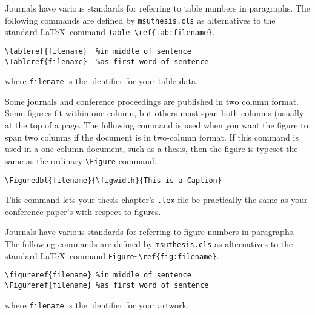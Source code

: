 Journals have various standards for referring
to table numbers in paragraphs.
The following commands are defined by {\tt msuthesis.cls}
as alternatives to 
the standard \LaTeX\ command \verb+Table \ref{tab:filename}+.

\newspacing{\singlespacing}\begin{verbatim}
\tableref{filename}  %in middle of sentence
\Tableref{filename}  %as first word of sentence
\end{verbatim}

\noindent where {\tt filename} is the identifier for your table data.


%
%
Some journals and conference proceedings are published 
in two column format.  Some figures fit within one column, 
but others must span both columns (usually at the top of a page.  
The following command
is used when you want the figure to span two columns
if the document is in two-column format.
If this command is used in a one column document,
such as a thesis, 
then the figure is typeset the same as 
the ordinary \verb+\Figure+ command.

\newspacing{\singlespacing}\begin{verbatim}
\Figuredbl{filename}{\figwidth}{This is a Caption}
\end{verbatim}

This command lets your thesis chapter's {\tt *.tex} file 
be practically the same
as your conference paper's with respect to figures.

Journals have various standards for referring 
to figure numbers in paragraphs.
The following commands are defined by {\tt msuthesis.cls}
as alternatives to 
the standard \LaTeX\ command \verb+Figure~\ref{fig:filename}+.



\newspacing{\singlespacing}\begin{verbatim}
\figureref{filename} %in middle of sentence
\Figureref{filename} %as first word of sentence
\end{verbatim}

\noindent where {\tt filename} is the identifier for your artwork.


